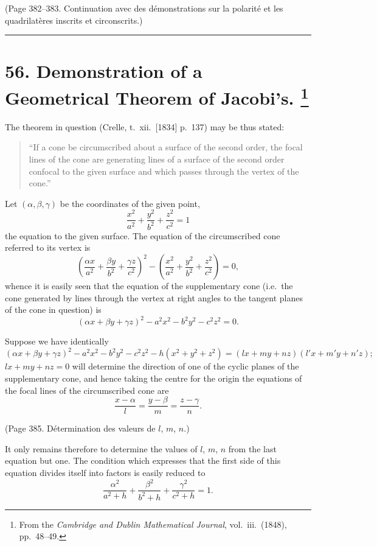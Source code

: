 \documentclass[11pt,a4paper]{article}
\theoremstyle{plain}
\theoremstyle{definition}
\begin{document}
(Page 382--383. Continuation avec des d\'{e}monstrations sur la polarit\'{e} et
les quadrilat\`{e}res inscrits et circonscrits.)

\bigskip
\hrule
\bigskip


\newpage
\section[Demonstration of a Geometrical Theorem of Jacobi's]{%
56. Demonstration of a Geometrical Theorem of Jacobi's.%
\footnote{From the \textit{Cambridge and Dublin Mathematical Journal}, vol.~iii.\ (1848), pp.~48--49.}}

The theorem in question (Crelle, t.~xii.\ [1834] p.~137) may be thus stated:
\begin{quote}
``If a cone be circumscribed about a surface of the second order, the focal lines
of the cone are generating lines of a surface of the second order confocal to the given
surface and which passes through the vertex of the cone.''
\end{quote}

Let $(\alpha, \beta, \gamma)$ be the coordinates of the given point,
\[
\frac{x^2}{a^2} + \frac{y^2}{b^2} + \frac{z^2}{c^2} = 1
\]
the equation to the given surface. The equation of the circumscribed cone referred to
its vertex is
\[
\left(\frac{\alpha x}{a^2} + \frac{\beta y}{b^2} + \frac{\gamma z}{c^2}\right)^2
- \left(\frac{x^2}{a^2} + \frac{y^2}{b^2} + \frac{z^2}{c^2}\right) = 0,
\]
whence it is easily seen that the equation of the supplementary cone (i.e.\ the cone
generated by lines through the vertex at right angles to the tangent planes of the
cone in question) is
\[
(\alpha x + \beta y + \gamma z)^2 - a^2x^2 - b^2y^2 - c^2z^2 = 0. \tag{$*$}
\]

Suppose we have identically
\[
(\alpha x + \beta y + \gamma z)^2 - a^2x^2 - b^2y^2 - c^2z^2 - h(x^2 + y^2 + z^2)
= (lx + my + nz)(l'x + m'y + n'z);
\]
$lx + my + nz = 0$ will determine the direction of one of the cyclic planes of the
supplementary cone, and hence taking the centre for the origin the equations of the focal
lines of the circumscribed cone are
\[
\frac{x - \alpha}{l} = \frac{y - \beta}{m} = \frac{z - \gamma}{n}.
\]

(Page 385. D\'{e}termination des valeurs de $l$, $m$, $n$.)

It only remains therefore to determine the values of $l$, $m$, $n$ from the last equation
but one. The condition which expresses that the first side of this equation divides
itself into factors is easily reduced to
\[
\frac{\alpha^2}{a^2 + h} + \frac{\beta^2}{b^2 + h} + \frac{\gamma^2}{c^2 + h} = 1. \tag{A}
\]
\end{document}
